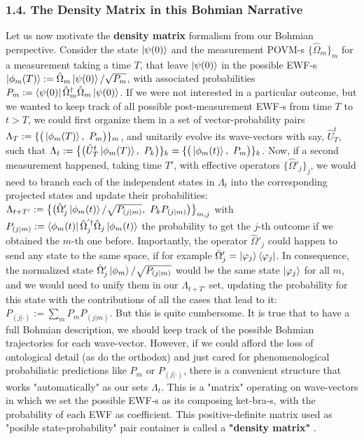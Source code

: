 \documentclass[11pt, a4paper]{article} %
\begin{document}
\subsubsection*{1.4. The Density Matrix in this Bohmian Narrative}\vspace{-0.15cm}
Let us now motivate the \textbf{density matrix} formalism from our Bohmian perspective. Consider the state $\ket{\psi(0)}$ and the measurement POVM-s $\{\hat{\Omega}_m\}_m$ for a measurement taking a time $T$, that leave $\ket{\psi(0)}$ in the possible EWF-s $\ket{\phi_m(T)}:=\hat{\Omega}_m\ket{\psi(0)}/\sqrt{P_m}$, with associated probabilities $P_m:=\bra{\psi(0)}\hat{\Omega}_m^\dagger \hat{\Omega}_m\ket{\psi(0)}$. If we were not interested in a particular outcome, but we wanted to keep track of all possible post-measurement EWF-s from time $T$ to $t>T$, we could first organize them in a set of vector-probability pairs $\Lambda_{T}:=\{\big(\ket{\phi_m(T)},\ P_m\big)\}_m$, and unitarily evolve its wave-vectors with say, $\hat{U}_{T}^{t}$, such that $\Lambda_{t}:=\big\{\big(\hat{U}^t_T\ket{\phi_m(T)},\ P_k\big)\}_k=\{\big(\ket{\phi_m(t)},\ P_m\big)\}_k$. Now, if a second measurement happened, taking time $T'$, with effective operators $\{\hat{\Omega}'_j\}_j$, we would need to branch each of the independent states in $\Lambda_t$ into the corresponding projected states and update their probabilities: $\Lambda_{t+T'}:=\big\{ \big(\hat{\Omega}_j'\ket{\phi_m(t)}/\sqrt{P_{(j|m)}},\ P_kP_{(j|m)}\big)\big\}_{m,j}$ with $P_{(j|m)}:=\bra{\phi_m(t)}\hat{\Omega}^{'\dagger}_j\hat{\Omega}_j\ket{\phi_m(t)}$ the probability to get the $j$-th outcome if we obtained the $m$-th one before. Importantly, the operator $\hat{\Omega}'_j$ could happen to send any state to the same space, if for example $\hat{\Omega}'_j=\ket{\varphi_j}\bra{\varphi_j}$. In consequence, the normalized state $\hat{\Omega}'_j \ket{\phi_m}/\sqrt{P_{(j|m)}}$ would be the same state $\ket{\varphi_j}$ for all $m$, and we would need to unify them in our $\Lambda_{t+T'}$ set, updating the probability for this state with the contributions of all the cases that lead to it: $P_{(j|\cdot)}:=\sum_m P_mP_{(j|m)}$. But this is quite cumbersome. It is true that to have a full Bohmian description, we should keep track of the possible Bohmian trajectories for each wave-vector. However, if we could afford the loss of ontological detail (as do the orthodox) and just cared for phenomenological probabilistic predictions like $P_m$ or $P_{(j|\cdot)}$, there is a convenient structure that works "automatically" as our sets $\Lambda_t$. This is a "matrix" operating on wave-vectors in which we set the possible EWF-s as its composing ket-bra-s, with the probability of each EWF as coefficient. This positive-definite matrix used as "posible state-probability" pair container is called a {\bf "density matrix"} \cite{vonNeumann, Durr, Holland}. 
\end{document}
